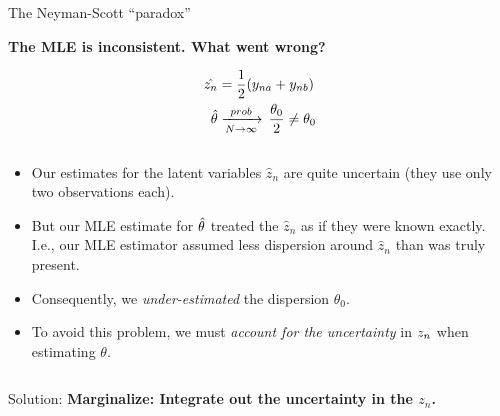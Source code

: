 
\begin{frame}{The Neyman-Scott ``paradox''}

\textbf{The MLE is inconsistent.  What went wrong?}

\begin{align*}
\hat{z_n} &= \frac{1}{2}(y_{na} + y_{nb}) \\
\hat\theta &\xrightarrow[N\rightarrow\infty]{prob}\, \frac{\theta_0}{2} \ne \theta_0
\end{align*}

\pause
\begin{columns}
    \begin{column}{0.8\textwidth}
\begin{itemize}
\item Our estimates for the latent variables $\hat{z}_n$ are quite uncertain (they use only
two observations each).
%
\item But our MLE estimate for $\hat\theta$ treated the $\hat{z}_n$ as if they
were known exactly.  I.e., our MLE estimator assumed less dispersion around
$\hat{z}_n$ than was truly present.
%
\item Consequently, we \emph{under-estimated} the dispersion $\theta_0$.
%
\item To avoid this problem, we must \emph{account for the uncertainty} in $z_n$
when estimating $\theta$.
%
\end{itemize}
\end{column}
\end{columns}

\vspace{2em}
Solution: \textbf{Marginalize: Integrate out the uncertainty in the $z_n$.}

\end{frame}





